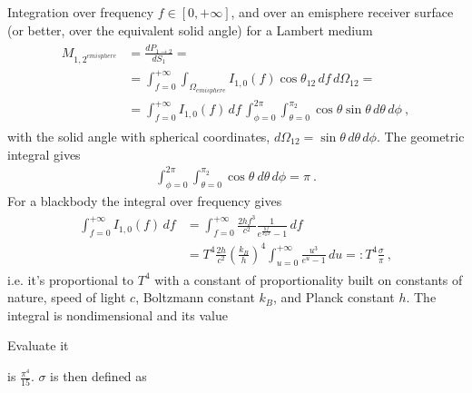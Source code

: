 \documentclass[letterpaper,10pt,english]{jupyterBook}
\begin{document}
\sphinxAtStartPar
Integration over frequency \(f \in [0, +\infty]\), and over an emisphere receiver surface (or better, over the equivalent solid angle) for a Lambert medium
\begin{equation*}
\begin{split}\begin{aligned}
  M_{1,2^{emisphere}}
  & = \frac{d P_{1 \rightarrow 2}}{d S_1} = \\
  & = \int_{f=0}^{+\infty} \int_{\Omega_{emisphere}} I_{1,0}(f) \cos \theta_{12} \, df \, d\Omega_{12} = \\
  & = \int_{f=0}^{+\infty}I_{1,0}(f) \, df \, \int_{\phi = 0}^{2\pi} \int_{\theta=0}^{\pi_2} \cos \theta \sin \theta \, d \theta \, d\phi \ ,
\end{aligned}\end{split}
\end{equation*}
\sphinxAtStartPar
with the solid angle with spherical coordinates, \(d\Omega_{12} = \sin \theta \, d \theta \, d\phi\). The geometric integral gives
\begin{equation*}
\begin{split}
  \int_{\phi = 0}^{2\pi} \int_{\theta=0}^{\pi_2} \cos \theta_{} \, d \theta \, d\phi = \pi \ .
\end{split}
\end{equation*}
\sphinxAtStartPar
For a black\sphinxhyphen{}body the integral over frequency gives
\begin{equation*}
\begin{split}\begin{aligned}
  \int_{f = 0}^{+\infty} I_{1,0}(f) \, df
  & = \int_{f=0}^{+\infty} \frac{2 h f^3}{c^2} \frac{1}{e^{\frac{hf}{k_B T}}-1} \, df \\
  & = T^4 \frac{2 h}{c^2} \left(\frac{k_B}{h}\right)^4 \int_{u=0}^{+\infty} \frac{u^3}{e^u-1} \, du =: T^4 \frac{\sigma}{\pi} \ ,
\end{aligned}\end{split}
\end{equation*}
\sphinxAtStartPar
i.e. it’s proportional to \(T^4\) with a constant of proportionality built on constants of nature, speed of light \(c\), Boltzmann constant \(k_B\), and Planck constant \(h\). The integral is non\sphinxhyphen{}dimensional and its value%
\begin{footnote}[2]\sphinxAtStartFootnote
{} Evaluate it
%
\end{footnote} is \(\frac{\pi^4}{15}\).  \(\sigma\) is then defined as
\end{document}
